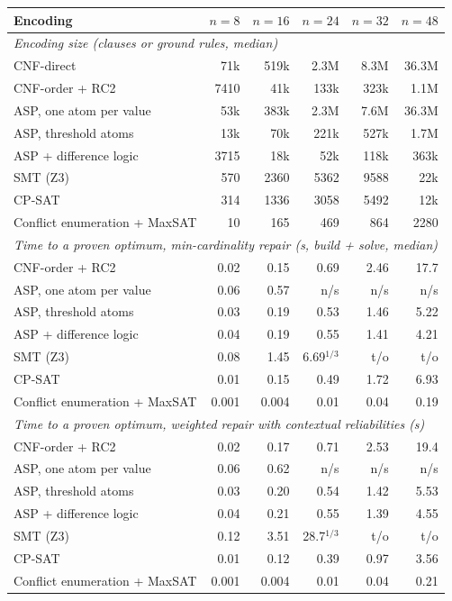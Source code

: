 \begin{tabular}{lrrrrr}
\toprule
Encoding & $n=8$ & $n=16$ & $n=24$ & $n=32$ & $n=48$ \\
\midrule
\multicolumn{6}{l}{\emph{Encoding size (clauses or ground rules, median)}}\\
CNF-direct & 71k & 519k & 2.3M & 8.3M & 36.3M \\
CNF-order + RC2 & 7410 & 41k & 133k & 323k & 1.1M \\
ASP, one atom per value & 53k & 383k & 2.3M & 7.6M & 36.3M \\
ASP, threshold atoms & 13k & 70k & 221k & 527k & 1.7M \\
ASP + difference logic & 3715 & 18k & 52k & 118k & 363k \\
SMT (Z3) & 570 & 2360 & 5362 & 9588 & 22k \\
CP-SAT & 314 & 1336 & 3058 & 5492 & 12k \\
Conflict enumeration + MaxSAT & 10 & 165 & 469 & 864 & 2280 \\
\midrule
\multicolumn{6}{l}{\emph{Time to a proven optimum, min-cardinality repair (s, build + solve, median)}}\\
CNF-order + RC2 & 0.02 & 0.15 & 0.69 & 2.46 & 17.7 \\
ASP, one atom per value & 0.06 & 0.57 & n/s & n/s & n/s \\
ASP, threshold atoms & 0.03 & 0.19 & 0.53 & 1.46 & 5.22 \\
ASP + difference logic & 0.04 & 0.19 & 0.55 & 1.41 & 4.21 \\
SMT (Z3) & 0.08 & 1.45 & 6.69$^{1/3}$ & t/o & t/o \\
CP-SAT & 0.01 & 0.15 & 0.49 & 1.72 & 6.93 \\
Conflict enumeration + MaxSAT & 0.001 & 0.004 & 0.01 & 0.04 & 0.19 \\
\midrule
\multicolumn{6}{l}{\emph{Time to a proven optimum, weighted repair with contextual reliabilities (s)}}\\
CNF-order + RC2 & 0.02 & 0.17 & 0.71 & 2.53 & 19.4 \\
ASP, one atom per value & 0.06 & 0.62 & n/s & n/s & n/s \\
ASP, threshold atoms & 0.03 & 0.20 & 0.54 & 1.42 & 5.53 \\
ASP + difference logic & 0.04 & 0.21 & 0.55 & 1.39 & 4.55 \\
SMT (Z3) & 0.12 & 3.51 & 28.7$^{1/3}$ & t/o & t/o \\
CP-SAT & 0.01 & 0.12 & 0.39 & 0.97 & 3.56 \\
Conflict enumeration + MaxSAT & 0.001 & 0.004 & 0.01 & 0.04 & 0.21 \\
\bottomrule
\end{tabular}